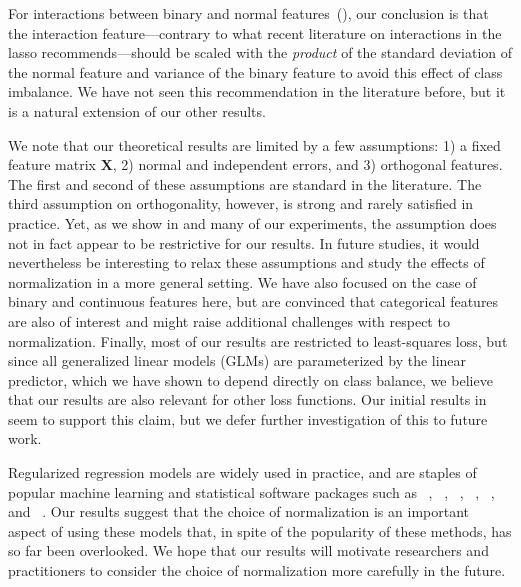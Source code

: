 For interactions between binary and normal features~(),
our conclusion is that the interaction feature---contrary to what recent literature on
interactions in the lasso recommends---should be scaled with the \emph{product} of the
standard deviation of the normal feature and variance of the binary feature to avoid this
effect of class imbalance. We have not seen this recommendation in the literature before,
but it is a natural extension of our other results.

We note that our theoretical results are limited by a few assumptions: 1) a fixed feature
matrix \(\bm{X}\), 2) normal and independent errors, and 3) orthogonal features. The first
and second of these assumptions are standard in the literature. The third assumption on
orthogonality, however, is strong and rarely satisfied in practice. Yet, as we show in
 and many of our experiments, the assumption does not in
fact appear to be restrictive for our results. In future studies, it would nevertheless be
interesting to relax these assumptions and study the effects of normalization in a more
general setting. We have also focused on the case of binary and continuous features here,
but are convinced that categorical features are also of interest and might raise additional
challenges with respect to normalization. Finally, most of our results are restricted to
least-squares loss, but since all generalized linear models (GLMs) are parameterized by the
linear predictor, which we have shown to depend directly on class balance, we believe that
our results are also relevant for other loss functions. Our initial results in
 seem to support this claim, but we defer further
investigation of this to future work.

Regularized regression models are widely used in practice, and are staples of popular
machine learning and statistical software packages such as
~\citep{friedman2010}, ~\citep{pedregosa2011},
~\citep{curtin2023}, ~\citep{bertrand2022},
~\citep{fan2008a}, and ~\citep{themathworksinc.2022}. Our
results suggest that the choice of normalization is an important aspect of using these
models that, in spite of the popularity of these methods, has so far been overlooked. We
hope that our results will motivate researchers and practitioners to consider the choice of
normalization more carefully in the future.
